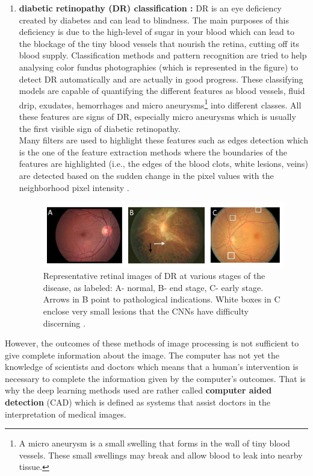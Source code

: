 \documentclass[11pt, openany]{report}
\theoremstyle{plain}
\theoremstyle{definition}
\theoremstyle{remark}
\begin{document}
\begin{enumerate}
\newpage
\item \textbf{diabetic retinopathy (DR) classification :} DR is an eye deficiency created by diabetes and can lead to blindness. The main purposes of this deficiency is due to the high-level of sugar in your blood which can lead to the blockage of the tiny blood vessels that nourish the retina, cutting off its blood supply. Classification methods and pattern recognition are tried to help analysing color fundus photographies (which is represented in the figure) to detect DR automatically and are actually in good progress. These classifying models are capable of quantifying the different features as blood vessels, fluid drip, exudates, hemorrhages and micro aneurysms\footnote{A micro aneurysm is a small swelling that forms in the wall of tiny blood vessels. These small swellings may break and allow blood to leak into nearby tissue.} into different classes. All these features are signs of DR, especially micro aneurysms which is usually the first visible sign of diabetic retinopathy. \\
Many filters are used to highlight these features such as edges detection which is the one of the feature extraction methods where the boundaries of the features are highlighted (i.e., the edges of the blood clots, white lesions, veins) are detected based on the sudden change in the pixel values with the neighborhood pixel intensity \cite{DR-1}.

\begin{figure}[h]
  \centering
  \includegraphics[scale=0.6]{figures/DR-images-examples.png}
  \caption{Representative retinal images of DR at various stages of the disease, as labeled: A- normal, B- end stage, C- early stage. Arrows in B point to pathological indications. White boxes in C enclose very small lesions that the CNNs have difficulty discerning \cite{DR-2}.}
  \label{fig:DR-example}
\end{figure}

\end{enumerate}

However, the outcomes of these methods of image processing is not sufficient to give complete information about the image. The computer has not yet the knowledge of scientists and doctors which means that a human's intervention is necessary to complete the information given by the computer's outcomes. That is why the deep learning methods used are rather called \textbf{computer aided detection} (CAD) which is defined as systems that assist doctors in the interpretation of medical images. 
\end{document}

